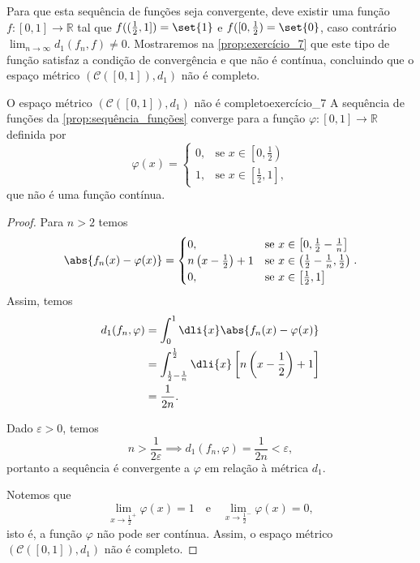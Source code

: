 Para que esta sequência de funções seja convergente, deve existir uma função \(f : [0,1] \to \mathbb{R}\) tal que \(f((\frac12, 1]) = \set{1}\) e \(f([0,\frac12) = \set{0}\), caso contrário \(\lim_{n\to\infty} d_1(f_n, f) \neq 0\). Mostraremos na \cref{prop:exercício_7} que este tipo de função satisfaz a condição de convergência e que não é contínua, concluindo que o espaço métrico \((\mathcal{C}([0,1]), d_1)\) não é completo.

\begin{proposition}{O espaço métrico \((\mathcal{C}([0,1]), d_1)\) não é completo}{exercício_7}
    A sequência de funções da \cref{prop:sequência_funções} converge para a função \(\varphi : [0,1] \to \mathbb{R}\) definida por
    \begin{equation*}
        \varphi(x) = \begin{cases}
            0, &\text{se }x \in \left[0,\frac12\right)\\
            1, &\text{se }x \in \left[\frac12,1\right],
        \end{cases}
    \end{equation*}
    que não é uma função contínua.
\end{proposition}
\begin{proof}
    Para \(n > 2\) temos
    \begin{equation*}
        \abs{f_n(x) - \varphi(x)} = \begin{cases}
            0, &\text{se }x \in \left[0, \frac12-\frac1n\right]\\
            n\left(x - \frac12\right) + 1&\text{se }x \in \left(\frac12 - \frac1n, \frac12\right)\\
            0, &\text{se }x \in \left[\frac12, 1\right]\\
        \end{cases}.
    \end{equation*}
    Assim, temos
    \begin{align*}
        d_1(f_n, \varphi) &= \int_0^1\dli{x} \abs{f_n(x) - \varphi(x)} \\
                          &= \int_{\frac12-\frac1n}^{\frac12}\dli{x} \left[n\left(x - \frac12\right) + 1\right]\\
                          &= \frac1{2n}.
    \end{align*}

    Dado \(\varepsilon > 0\), temos
    \begin{equation*}
        n > \frac{1}{2\varepsilon} \implies d_1(f_n, \varphi) = \frac{1}{2n} < \varepsilon,
    \end{equation*}
    portanto a sequência é convergente a \(\varphi\) em relação à métrica \(d_1\).

    Notemos que
    \begin{equation*}
        \lim_{x \to \frac12^+} \varphi(x) = 1\quad\text{e}\quad\lim_{x\to\frac12^-}\varphi(x) = 0,
    \end{equation*}
    isto é, a função \(\varphi\) não pode ser contínua. Assim, o espaço métrico \((\mathcal{C}([0,1]),d_1)\) não é completo.
\end{proof}
